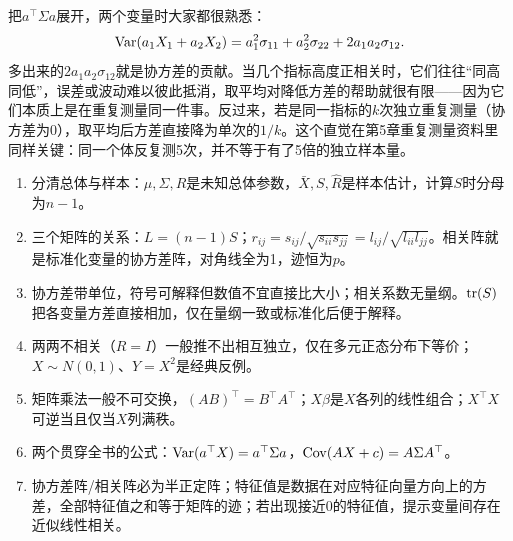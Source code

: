 
\begin{sikao}
把$a^\top\Sigma a$展开，两个变量时大家都很熟悉：
\[
\operatorname{Var}(a_1X_1+a_2X_2)=a_1^2\sigma_{11}+a_2^2\sigma_{22}+2a_1a_2\sigma_{12}.
\]
多出来的$2a_1a_2\sigma_{12}$就是协方差的贡献。当几个指标高度正相关时，它们往往“同高同低”，误差或波动难以彼此抵消，取平均对降低方差的帮助就很有限——因为它们本质上是在重复测量同一件事。反过来，若是同一指标的$k$次独立重复测量（协方差为0），取平均后方差直接降为单次的$1/k$。这个直觉在第5章重复测量资料里同样关键：同一个体反复测5次，并不等于有了5倍的独立样本量。
\end{sikao}

\begin{fuxi}
\begin{enumerate}
\item 分清总体与样本：$\mu,\Sigma,R$是未知总体参数，$\bar X,S,\widehat R$是样本估计，计算$S$时分母为$n-1$。
\item 三个矩阵的关系：$L=(n-1)S$；$r_{ij}=s_{ij}/\sqrt{s_{ii}s_{jj}}=l_{ij}/\sqrt{l_{ii}l_{jj}}$。相关阵就是标准化变量的协方差阵，对角线全为1，迹恒为$p$。
\item 协方差带单位，符号可解释但数值不宜直接比大小；相关系数无量纲。$\operatorname{tr}(S)$把各变量方差直接相加，仅在量纲一致或标准化后便于解释。
\item 两两不相关（$R=I$）一般推不出相互独立，仅在多元正态分布下等价；$X\sim N(0,1)$、$Y=X^2$是经典反例。
\item 矩阵乘法一般不可交换，$(AB)^\top=B^\top A^\top$；$X\beta$是$X$各列的线性组合；$X^\top X$可逆当且仅当$X$列满秩。
\item 两个贯穿全书的公式：$\operatorname{Var}(a^\top X)=a^\top\Sigma a$，$\operatorname{Cov}(AX+c)=A\Sigma A^\top$。
\item 协方差阵/相关阵必为半正定阵；特征值是数据在对应特征向量方向上的方差，全部特征值之和等于矩阵的迹；若出现接近0的特征值，提示变量间存在近似线性相关。
\end{enumerate}
\end{fuxi}
